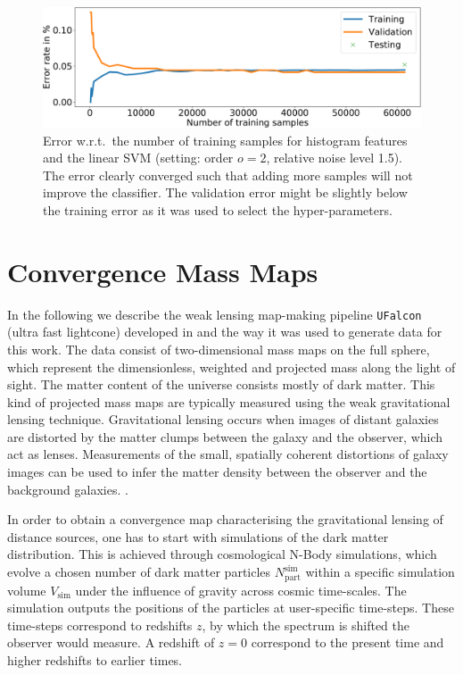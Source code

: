 \documentclass[final,twocolumn,3p,times,sort&compress]{elsarticle}
\newcommand{\1}{\b{1}}              %
\newcommand{\0}{\b{0}}              %
\newcommand{\pkg}[1]{\texttt{#1}}
\begin{document}
\begin{figure}[ht!]
	\centering
	\includegraphics[width=\linewidth]{hist_error_order2_noise1_5}
	\caption{Error w.r.t.\ the number of training samples for histogram features and the linear SVM (setting: order $o=2$, relative noise level 1.5). The error clearly converged such that adding more samples will not improve the classifier. The validation error might be slightly below the training error as it was used to select the hyper-parameters.}
	\label{fig:hist_error_evolution}
\end{figure}

\section{Convergence Mass Maps}
\label{sec:convergence_mass_maps}

In the following we describe the weak lensing map-making pipeline \pkg{UFalcon} (ultra fast lightcone) developed in \citep{sgier2018fastgeneration} and the way it was used to generate data for this work.
The data consist of two-dimensional mass maps on the full sphere, which represent the dimensionless, weighted and projected mass along the light of sight.
The matter content of the universe consists mostly of dark matter.
This kind of projected mass maps are typically measured using the weak gravitational lensing technique.
Gravitational lensing occurs when images of distant galaxies are distorted by the matter clumps between the galaxy and the observer, which act as lenses.
Measurements of the small, spatially coherent distortions of galaxy images can be used to infer the matter density between the observer and the background galaxies.
\citep[see][for a review of gravitational lensing]{bartelman2010gravitationallensing}.

In order to obtain a convergence map characterising the gravitational lensing of distance sources, one has to start with simulations of the dark matter distribution.
This is achieved through cosmological N-Body simulations, which evolve a chosen number of dark matter particles $N_\mathrm{part}^\mathrm{sim}$ within a specific simulation volume $V_\mathrm{sim}$ under the influence of gravity across cosmic time-scales. The simulation outputs the positions of the particles at user-specific time-steps. These time-steps correspond to redshifts $z$, by which the spectrum is shifted the observer would measure. A redshift of $z=0$ correspond to the present time and higher redshifts to earlier times.
\end{document}
